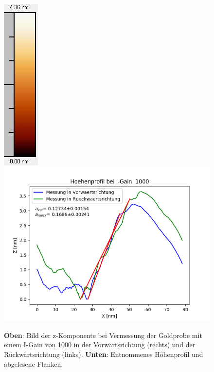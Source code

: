 \documentclass[12pt,a4paper]{article}
\begin{document}
\begin{figure}
\includegraphics[scale=0.6]{Bilder/Anhang/IGain/1000_IGain_nach_Skala.jpg}
\includegraphics[scale=0.6]{Bilder/Anhang/IGain/Profil_IGain_1000.png}
\caption{\textbf{Oben}: Bild der z-Komponente bei Vermessung der Goldprobe mit einem I-Gain von 1000 in der Vorwärtsrichtung (rechts) und der Rückwärtsrichtung (links). \textbf{Unten}: Entnommenes Höhenprofil und abgelesene Flanken.}
\end{figure}
\end{document}
